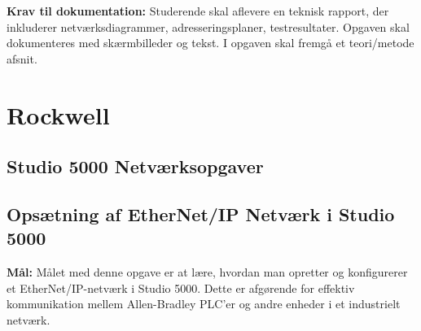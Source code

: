 \noindent\textbf{Krav til dokumentation:} Studerende skal aflevere en teknisk rapport, der inkluderer netværksdiagrammer, adresseringsplaner, testresultater. Opgaven skal dokumenteres med skærmbilleder og tekst. I opgaven skal fremgå et teori/metode afsnit.
\chapter{Rockwell}
\section{Studio 5000 Netværksopgaver}
\label{sec:studio_5000_opgaver}

\section{Opsætning af EtherNet/IP Netværk i Studio 5000}
\label{subsec:ethernet_ip_setup}

\textbf{Mål:} Målet med denne opgave er at lære, hvordan man opretter og konfigurerer et EtherNet/IP-netværk i Studio 5000. Dette er afgørende for effektiv kommunikation mellem Allen-Bradley PLC'er og andre enheder i et industrielt netværk.

